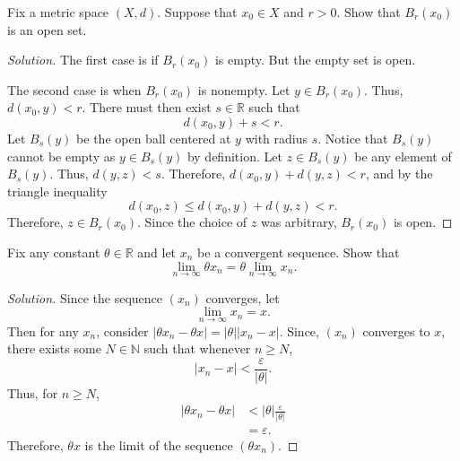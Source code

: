 \documentclass[11pt,letterpaper]{article}
\newcommand{\N}{\mathbb{N}}
\newcommand{\R}{\mathbb{R}}
\newcommand{\eps}{\varepsilon}
\renewcommand{\epsilon}{\eps}
\newenvironment{prob}[1]
  {\renewcommand\theinnerprob{#1}\innerprob}
  {\endinnerprob}
\newenvironment{solution}
  {\renewcommand\qedsymbol{}\begin{proof}[Solution]}
  {\end{proof}\bigskip}
\begin{document}
\begin{prob}{5} %
Fix a metric space $(X,d)$.  Suppose that $x_0 \in X$ and $r>0$.  Show that $B_r(x_0)$ is an open set.
\end{prob}
\begin{solution}
	The first case is if $B_r(x_0)$ is empty. But the empty set is open.
	
	The second case is when $B_r(x_0)$ is nonempty. Let $y\in B_r(x_0)$. Thus, $d(x_0,y) < r$. There must then exist $s \in \R$ such that $$d(x_0,y) + s < r.$$ Let $B_s(y)$ be the open ball centered at $y$ with radius $s$. Notice that $B_s(y)$ cannot be empty as $y\in B_s(y)$ by definition. Let $z \in B_s(y)$ be any element of $B_s(y)$. Thus, $d(y,z) < s$. Therefore, $d(x_0,y) + d(y,z) < r$, and by the triangle inequality $$d(x_0,z) \leq d(x_0,y) + d(y,z) < r.$$ Therefore, $z\in B_r(x_0)$. Since the choice of $z$ was arbitrary, $B_r(x_0)$ is open. 
	
	 
\end{solution}
\newpage





\begin{prob}{6} %
Fix any constant $\theta \in \R$ and let $x_n$ be a convergent sequence.  Show that
\[
	\lim_{n\to\infty} \theta x_n = \theta \lim_{n\to\infty}x_n.
\]
\end{prob}
\begin{solution}
	Since the sequence $(x_n)$ converges, let $$ \lim_{n\to\infty} x_n = x.$$ Then for any $x_n$, consider $|\theta x_n - \theta x| = |\theta||x_n - x|$. Since, $(x_n)$ converges to $x$, there exists some $N \in \N$ such that whenever $n \geq N$, $$|x_n - x| < \frac{\epsilon}{|\theta |}.$$ Thus, for $n\geq N$, 
	\[\begin{split}
		|\theta x_n - \theta x| &< |\theta|\frac{\epsilon}{|\theta |}\\
		&= \epsilon.
	\end{split}\]
	Therefore, $\theta x$ is the limit of the sequence $(\theta x_n)$.
\end{solution}
\newpage
\end{document}

